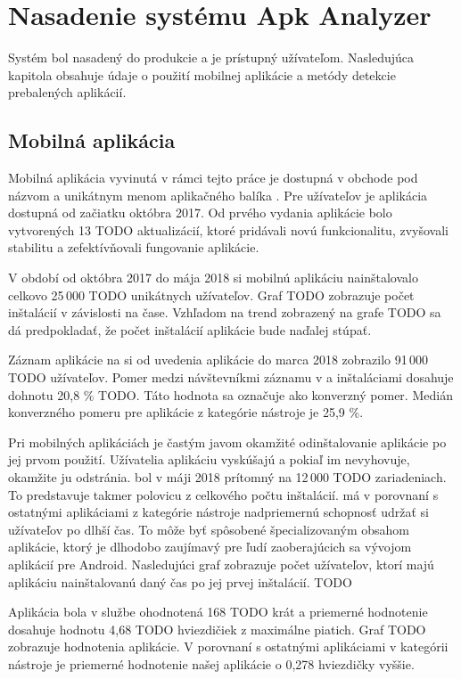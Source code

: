 \chapter{Nasadenie systému Apk Analyzer}
Systém  bol nasadený do produkcie a je prístupný užívateľom. Nasledujúca kapitola obsahuje údaje o použití mobilnej aplikácie a metódy detekcie prebalených aplikácií.

\section{Mobilná aplikácia}

Mobilná aplikácia vyvinutá v rámci tejto práce je dostupná v obchode  pod názvom  a unikátnym menom aplikačného balíka . Pre užívateľov je aplikácia dostupná od začiatku októbra 2017. Od prvého vydania aplikácie bolo vytvorených 13 TODO aktualizácií, ktoré pridávali novú funkcionalitu, zvyšovali stabilitu a zefektívňovali fungovanie aplikácie.

V období od októbra 2017 do mája 2018 si mobilnú aplikáciu nainštalovalo celkovo 25\,000 TODO unikátnych užívateľov. Graf TODO zobrazuje počet inštalácií v závislosti na čase. Vzhľadom na trend zobrazený na grafe TODO sa dá predpokladať, že počet inštalácií aplikácie bude naďalej stúpať. 

Záznam aplikácie na  si od uvedenia aplikácie do marca 2018 zobrazilo 91\,000 TODO užívateľov. Pomer medzi návštevníkmi záznamu v  a inštaláciami dosahuje dohnotu 20,8 \% TODO. Táto hodnota sa označuje ako konverzný pomer. Medián konverzného pomeru pre aplikácie z kategórie nástroje je 25,9 \%. 

Pri mobilných aplikáciách je častým javom okamžité odinštalovanie aplikácie po jej prvom použití. Užívatelia aplikáciu vyskúšajú a pokiaľ im nevyhovuje, okamžite ju odstránia.  bol v máji 2018 prítomný na 12\,000 TODO zariadeniach. To predstavuje takmer polovicu z celkového počtu inštalácií.  má v porovnaní s ostatnými aplikáciami z kategórie nástroje nadpriemernú schopnosť udržať si užívateľov po dlhší čas. To môže byť spôsobené špecializovaným obsahom aplikácie, ktorý je dlhodobo zaujímavý pre ľudí zaoberajúcich sa vývojom aplikácií pre Android. Nasledujúci graf zobrazuje počet užívateľov, ktorí majú aplikáciu nainštalovanú daný čas po jej prvej inštalácií. TODO

Aplikácia bola v službe  ohodnotená 168 TODO krát a priemerné hodnotenie dosahuje hodnotu 4,68 TODO hviezdičiek z maximálne piatich. Graf TODO zobrazuje hodnotenia aplikácie. V porovnaní s ostatnými aplikáciami v kategórii nástroje je priemerné hodnotenie našej aplikácie o 0,278 hviezdičky vyššie.

